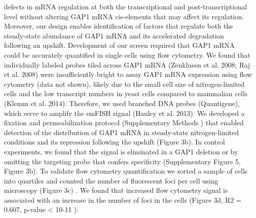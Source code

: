 defects in mRNA regulation at both the transcriptional and
post-transcriptional level without altering GAP1 mRNA cis-elements
that may affect its regulation. Moreover, our design enables
identification of factors that regulate both the steady-state
abundance of GAP1 mRNA and its accelerated degradation following an
upshift.  Development of our screen required that GAP1 mRNA could be
accurately quantified in single cells using flow cytometry. We found
that  individually labeled probes tiled across GAP1 mRNA (Zenklusen et
al. 2008; Raj et al. 2008) were insufficiently bright to assay GAP1
mRNA expression using flow cytometry (data not shown), likely due to
the small cell size of nitrogen-limited cells and the low transcript
numbers in yeast cells compared to mammalian cells (Klemm et al.
2014). Therefore, we used branched DNA probes (Quantigene), which
serve to amplify the smFISH signal (Hanley et al. 2013). We developed
a fixation and permeabilization protocol (Supplementary Methods )
that enabled detection of the  distribution of  GAP1 mRNA in
steady-state nitrogen-limited conditions and its repression following
the  upshift (Figure 3b). In control experiments, we found that the
signal is eliminated in a GAP1 deletion or by omitting the  targeting
probe that confers specificity (Supplementary Figure 5, Figure 3b).
To validate flow cytometry  quantification we sorted a sample of cells
into quartiles and counted the number of fluorescent foci per cell
using microscopy (Figure 3c) . We found that increased flow cytometry
signal is associated with an increase in the number of foci in the
cells (Figure 3d, R2 = 0.607, p-value < 10-11 ).


